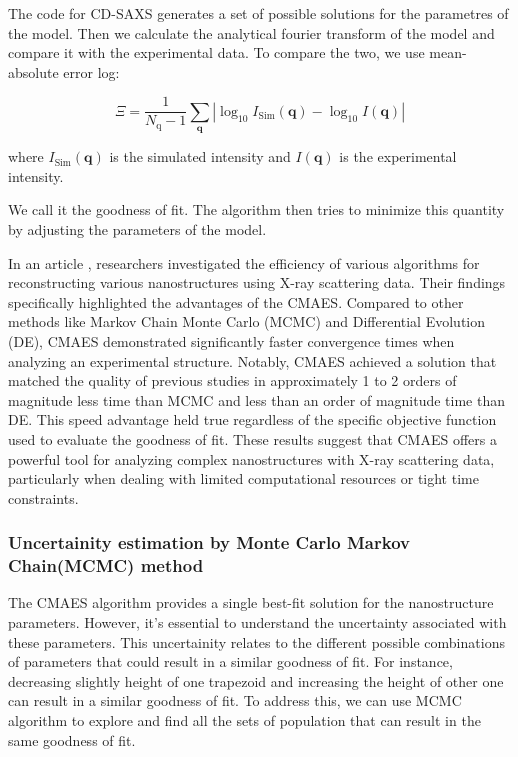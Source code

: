 \FloatBarrier

\medskip

The code for CD-SAXS generates a set of possible solutions for the parametres of the model. Then we calculate the 
analytical fourier transform of the model and compare it with the experimental data. To compare the two,
we use mean-absolute error log:

\medskip

\begin{equation}
    \Xi=\frac{1}{N_{\mathrm{q}}-1} \sum_{\mathbf{q}}\left|\log _{10} I_{\mathrm{Sim}}(\mathbf{q})-\log _{10} I(\mathbf{q})\right|
\end{equation}

\medskip

where $I_{\mathrm{Sim}}(\mathbf{q})$ is the simulated intensity and $I(\mathbf{q})$ is the experimental intensity.

\medskip

We call it the goodness of fit. The algorithm then tries to minimize this quantity by adjusting the parameters of the model.

\medskip

In an article \cite{hannon2016advancing}, researchers investigated the efficiency of various algorithms
for reconstructing various nanostructures using X-ray scattering data.
Their findings specifically highlighted the advantages of the CMAES. Compared to other
methods like Markov Chain Monte Carlo (MCMC) and Differential Evolution 
(DE), CMAES demonstrated significantly faster convergence times when 
analyzing an experimental structure. Notably, CMAES achieved a solution 
that matched the quality of previous studies in approximately 1 to 2 
orders of magnitude less time than MCMC and less than an order of 
magnitude time than DE. This speed advantage held true regardless 
of the specific objective function used to evaluate the goodness of fit. 
These results suggest that CMAES offers a powerful tool for analyzing 
complex nanostructures with X-ray scattering data, particularly when 
dealing with limited computational resources or tight time constraints.

\subsubsection{Uncertainity estimation by Monte Carlo Markov Chain(MCMC) method}
\label{sec:mcmc_cdsaxs}

The CMAES algorithm provides a single best-fit solution for the nanostructure parameters. However, it's essential to understand the uncertainty associated with these parameters.
This uncertainity relates to the different possible combinations of parameters that could result in a similar goodness of fit. 
For instance, decreasing slightly height of one trapezoid and increasing the height of other one can result in a similar goodness of fit.
To address this, we can use MCMC algorithm to explore and find all the sets of population that can result in the same goodness of fit.

